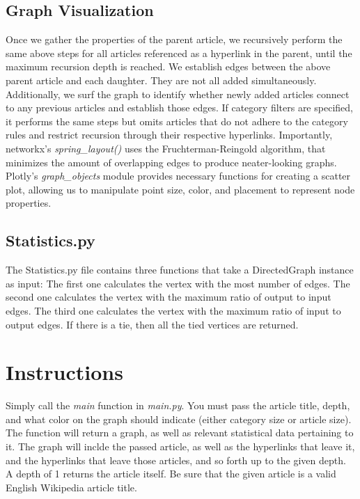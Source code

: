 \documentclass[fontsize=11pt]{article}
\begin{document}
    \subsection*{Graph Visualization}
    Once we gather the properties of the parent article, we recursively perform the same above steps for all articles referenced as a hyperlink in the parent, until the maximum recursion depth is reached. We establish edges between the above parent article and each daughter. They are not all added simultaneously. Additionally, we surf the graph to identify whether newly added articles connect to any previous articles and establish those edges. If category filters are specified, it performs the same steps but omits articles that do not adhere to the category rules and restrict recursion through their respective hyperlinks. Importantly, networkx's \textit{spring\_layout()} uses the Fruchterman-Reingold algorithm, that minimizes the amount of overlapping edges to produce neater-looking graphs. Plotly's \textit{graph\_objects} module provides necessary functions for creating a scatter plot, allowing us to manipulate point size, color, and placement to represent node properties.
    \subsection*{Statistics.py}
The Statistics.py file contains three functions that take a DirectedGraph instance as input: The first one calculates the vertex with the most number of edges. The second one calculates the vertex with the maximum ratio of output to input edges. The third one calculates the vertex with the maximum ratio of input to output edges. If there is a tie, then all the tied vertices are returned. 
    
    \section*{Instructions}
    Simply call the \textit{main} function in \textit{main.py}. You must pass the article title, depth, and what color on the graph should indicate (either category size or article size). The function will return a graph, as well as relevant statistical data pertaining to it. The graph will inclde the passed article, as well as the hyperlinks that leave it, and the hyperlinks that leave those articles, and so forth up to the given depth. A depth of 1 returns the article itself. Be sure that the given article is a valid  English Wikipedia article title. 
    
\end{document}
